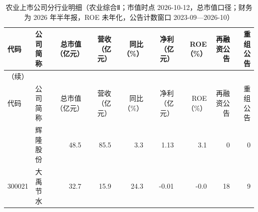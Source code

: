 \begingroup\scriptsize\setlength{\tabcolsep}{2pt}
\begin{longtable}{@{}llrrrrrrr@{}}
\caption{农业上市公司分行业明细（农业综合Ⅱ；市值时点 2026-10-12，总市值口径；财务为 2026 年半年报，ROE 未年化，公告计数窗口 2023-09---2026-10）}\label{tab:comp-misc}\\
\toprule
代码 & 公司简称 & 总市值（亿元） & 营收（亿元） & 同比（\%） & 净利（亿元） & ROE（\%） & 再融资公告 & 重组公告 \\
\midrule
\endfirsthead
\multicolumn{9}{l}{\small（续）}\\
\toprule
代码 & 公司简称 & 总市值（亿元） & 营收（亿元） & 同比（\%） & 净利（亿元） & ROE（\%） & 再融资公告 & 重组公告 \\
\midrule
\endhead
\bottomrule
\endlastfoot
002556 & 辉隆股份 & 48.5 & 85.5 & 3.3 & 1.13 & 3.1 & 0 & 0 \\
300021 & 大禹节水 & 32.7 & 15.9 & 24.3 & -0.01 & -0.0 & 18 & 9 \\
\end{longtable}
\endgroup
